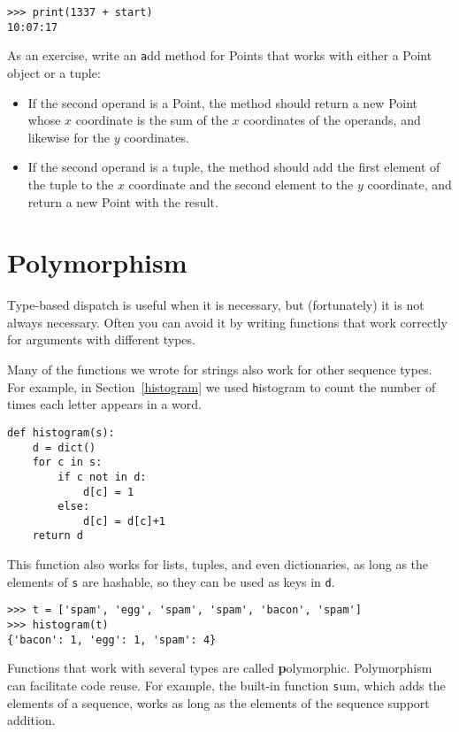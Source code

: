 \documentclass[
DIV=11,
fontsize=13,
twoside,
headinclude=false,
titlepage=firstiscover,
abstract=true,
headsepline=true,
footsepline=true,
chapterprefix=true, %
headings=big,
bibliography=totoc,%
captions=tableheading
]{scrbook}
\theoremstyle{definition}
\begin{document}
\begin{lstlisting}
>>> print(1337 + start)
10:07:17
\end{lstlisting}
%

As an exercise, write an {\texttt add} method for Points that works with
either a Point object or a tuple:

\begin{itemize}

\item If the second operand is a Point, the method should return a new
Point whose $x$ coordinate is the sum of the $x$ coordinates of the
operands, and likewise for the $y$ coordinates.

\item If the second operand is a tuple, the method should add the
first element of the tuple to the $x$ coordinate and the second
element to the $y$ coordinate, and return a new Point with the result. 

\end{itemize}




\section{Polymorphism}
\label{polymorphism}

Type-based dispatch is useful when it is necessary, but (fortunately)
it is not always necessary.  Often you can avoid it by writing functions
that work correctly for arguments with different types.

Many of the functions we wrote for strings also
work for other sequence types.
For example, in Section~\ref{histogram}
we used {\texttt histogram} to count the number of times each letter
appears in a word.

\begin{lstlisting}
def histogram(s):
    d = dict()
    for c in s:
        if c not in d:
            d[c] = 1
        else:
            d[c] = d[c]+1
    return d
\end{lstlisting}
%
This function also works for lists, tuples, and even dictionaries,
as long as the elements of {\texttt s} are hashable, so they can be used
as keys in {\texttt d}.

\begin{lstlisting}
>>> t = ['spam', 'egg', 'spam', 'spam', 'bacon', 'spam']
>>> histogram(t)
{'bacon': 1, 'egg': 1, 'spam': 4}
\end{lstlisting}
%
Functions that work with several types are called {\textbf polymorphic}.
Polymorphism can facilitate code reuse.  For example, the built-in
function {\texttt sum}, which adds the elements of a sequence, works
as long as the elements of the sequence support addition.
\end{document}
